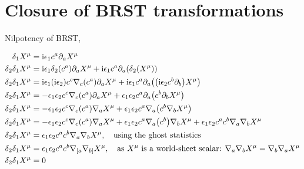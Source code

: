 \section{Closure of BRST transformations}\label{brstclosure}

Nilpotency of BRST,

\begin{align*}
    \delta_1X^\mu&=\textnormal{i}\epsilon_1c^a\partial_a X^\mu\\
    \delta_2\delta_1X^\mu&=\textnormal{i}\epsilon_1\delta_2\qty(c^a)\partial_a X^\mu+\textnormal{i}\epsilon_1c^a\partial_a\qty( \delta_2\qty(X^\mu))\\
    \delta_2\delta_1X^\mu&=\textnormal{i}\epsilon_1\qty(\textnormal{i}\epsilon_2)c^c\nabla_c\qty(c^a)\partial_a X^\mu+\textnormal{i}\epsilon_1c^a\partial_a \qty(\qty(\textnormal{i}\epsilon_2c^b\partial_b)X^\mu)\\
    \delta_2\delta_1X^\mu&=-\epsilon_1\epsilon_2c^c\nabla_c\qty(c^a)\partial_a X^\mu+\epsilon_1\epsilon_2c^a\partial_a \qty(c^b\partial_b X^\mu)\\
    \delta_2\delta_1X^\mu&=-\epsilon_1\epsilon_2c^c\nabla_c\qty(c^a)\nabla_a X^\mu+\epsilon_1\epsilon_2c^a\nabla_a \qty(c^b\nabla_b X^\mu)\\
    \delta_2\delta_1X^\mu&=-\epsilon_1\epsilon_2c^c\nabla_c\qty(c^a)\nabla_a X^\mu+\epsilon_1\epsilon_2c^a\nabla_a \qty(c^b)\nabla_b X^\mu+\epsilon_1\epsilon_2c^ac^b\nabla_a\nabla_b X^\mu\\
    \delta_2\delta_1X^\mu&=\epsilon_1\epsilon_2c^ac^b\nabla_a\nabla_b X^\mu, \ \ \ \textnormal{using the ghost statistics}\\
    \delta_2\delta_1X^\mu&=\epsilon_1\epsilon_2c^ac^b\nabla_{[a}\nabla_{b]} X^\mu,\ \ \ \textnormal{as $X^\mu$ is a world-sheet scalar: }\nabla_a\nabla_b X^\mu=\nabla_b\nabla_a X^\mu\\
    \delta_2\delta_1X^\mu&=0
\end{align*}


